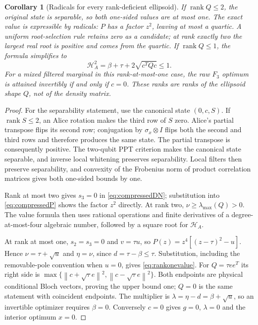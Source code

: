 \documentclass[11pt]{article}
\newtheorem{corollary}[theorem]{Corollary}
\theoremstyle{remark}\newtheorem{remark}[theorem]{Remark}
\newcommand{\HF}{\mathcal H}
\newcommand{\norm}[1]{\left\lVert#1\right\rVert}
\begin{document}
\begin{corollary}[Radicals for every rank-deficient ellipsoid]
\label{cor:rankdeficient}
If $\operatorname{rank}Q\leq2$, the original state is separable, so both
one-sided values are at most one. The exact value is expressible by radicals: $P$
has a factor $z^2$, leaving at most a quartic. A uniform root-selection
rule retains zero as a candidate; at rank exactly two the largest real
root is positive and comes from the quartic.
If $\operatorname{rank}Q\leq1$, the formula simplifies to
\begin{equation}\label{eq:rankonevalue}\boxed{
 \HF_A^2=\beta+\tau+2\sqrt{c^TQc}\leq1.}
\end{equation}
For a mixed filtered marginal in this rank-at-most-one case, the raw
$F_3$ optimum is attained invertibly if and only if $c=0$.
These ranks are ranks of the ellipsoid shape $Q$, not of the density matrix.
\end{corollary}
\begin{proof}
For the separability statement, use the canonical state $(0,c,S)$.
If $\operatorname{rank}S\leq2$, an Alice rotation makes the third row of
$S$ zero. Alice's partial transpose flips its second row; conjugation by
$\sigma_x\otimes I$ flips both the second and third rows and therefore
produces the same state. The partial transpose is consequently positive.
The two-qubit PPT criterion \cite{horodecki} makes the canonical state
separable, and inverse local whitening preserves separability. Local filters
then preserve separability, and convexity of the Frobenius norm of product
correlation matrices gives both one-sided bounds by one.

Rank at most two gives $s_3=0$ in \eqref{eq:compressedDN}; substitution
into \eqref{eq:compressedP} shows the factor $z^2$ directly. At rank two,
$\nu\geq\lambda_{\max}(Q)>0$. The value formula then uses rational
operations and finite derivatives of a degree-at-most-four algebraic
number, followed by a square root for $\HF_A$.

At rank at most one, $s_2=s_3=0$ and $v=\tau u$, so
$P(z)=z^4[(z-\tau)^2-u]$. Hence $\nu=\tau+\sqrt u$ and
$\eta=\nu$, since $d=\tau-\beta\leq\tau$. Substitution, including the
removable-pole convention when $u=0$, gives \eqref{eq:rankonevalue}.
For $Q=\tau ee^T$ its right side is
$\max\{\norm{c+\sqrt\tau e}^2,\norm{c-\sqrt\tau e}^2\}$.
Both endpoints are physical conditional Bloch vectors, proving the upper
bound one; $Q=0$ is the same statement with coincident endpoints.
The multiplier is $\lambda=\eta-d=\beta+\sqrt u$, so an invertible
optimizer requires $\beta=0$. Conversely $c=0$ gives $g=0$, $\lambda=0$
and the interior optimum $x=0$.
\end{proof}
\end{document}
